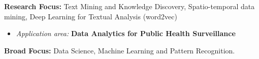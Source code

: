 \par{\textbf{Research Focus: } Text Mining and Knowledge Discovery, Spatio-temporal data mining, Deep Learning for Textual Analysis (word2vec)\vspace{0.5em}
\begin{itemize}
  \item \textit{Application area:} \textbf{Data Analytics for Public Health Surveillance}\\
\end{itemize}
        \textbf{Broad Focus:} Data Science, Machine Learning and Pattern Recognition.\vspace{0.5em}
}
\vspace{1em}
